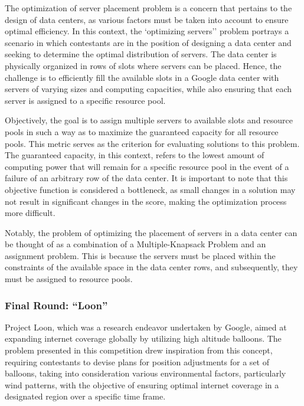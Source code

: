 The optimization of server placement problem is a concern that pertains to the
design of data centers, as various factors must be taken into account to ensure
optimal efficiency. In this context, the `optimizing servers'' problem portrays
a scenario in which contestants are in the position of designing a data center
and seeking to determine the optimal distribution of servers.
The data center is physically organized in rows of slots where servers can be placed.
Hence, the challenge is to efficiently fill the available slots in a Google
data center with servers of varying sizes and computing capacities, while also
ensuring that each server is assigned to a specific resource pool.

Objectively, the goal is to assign multiple servers to available slots and
resource pools in such a way as to maximize the guaranteed capacity for
all resource pools. This metric serves as the criterion for evaluating solutions
to this problem. The guaranteed capacity, in this context, refers to the
lowest amount of computing power that will remain for a specific resource pool
in the event of a failure of an arbitrary row of the data center. It is
important to note that this objective function is considered a bottleneck, as
small changes in a solution may not result in significant changes in the score,
making the optimization process more difficult.

Notably, the problem of optimizing the placement of servers in a data center
can be thought of as a combination of a Multiple-Knapsack Problem and an
assignment problem. This is because the servers must be placed within the
constraints of the available space in the data center rows, and subsequently,
they must be assigned to resource pools.

\subsubsection{Final Round: ``Loon''}
\label{section:hashcode2015-final}

Project Loon, which was a research endeavor undertaken by Google, aimed at
expanding internet coverage globally by utilizing high altitude balloons. The
problem presented in this competition drew inspiration from this concept,
requiring contestants to devise plans for position adjustments for a set
of balloons, taking into consideration various environmental factors,
particularly wind patterns, with the objective of ensuring optimal internet
coverage in a designated region over a specific time frame.

